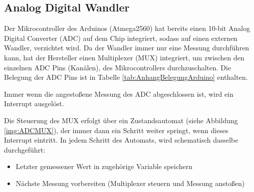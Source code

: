 \documentclass[a4paper, 11pt]{report}
\begin{document}
	\subsection{Analog Digital Wandler}\label{subsec:ADC}

		Der Mikrocontroller des Arduinos (Atmega2560) hat bereits einen 10-bit Analog Digital Converter (ADC) auf dem Chip integriert, sodass auf einen externen Wandler, verzichtet wird.
		Da der Wandler immer nur eine Messung durchführen kann, hat der Hersteller einen Multiplexer (MUX) integriert, um zwischen den einzelnen ADC Pins (Kanälen), des Mikrocontrollers durchzuschalten.
		Die Belegung der ADC Pins ist in Tabelle \ref{tab:AnhangBelegungArduino} enthalten.

		Immer wenn die angestoßene Messung des ADC abgeschlossen ist, wird ein Interrupt ausgelöst.

		Die Steuerung des MUX erfolgt über ein Zustandsautomat (siehe Abbildung \ref{img:ADCMUX}), der immer dann ein Schritt weiter springt, wenn dieses Interrupt eintritt. In jedem Schritt des Automats, wird schematisch dasselbe durchgeführt:
		\begin{itemize}
		\item	Letzter gemessener Wert in zugehörige Variable speichern
		\item Nächste Messung vorbereiten (Multiplexer steuern und Messung anstoßen)
		\end{itemize}
\end{document}
